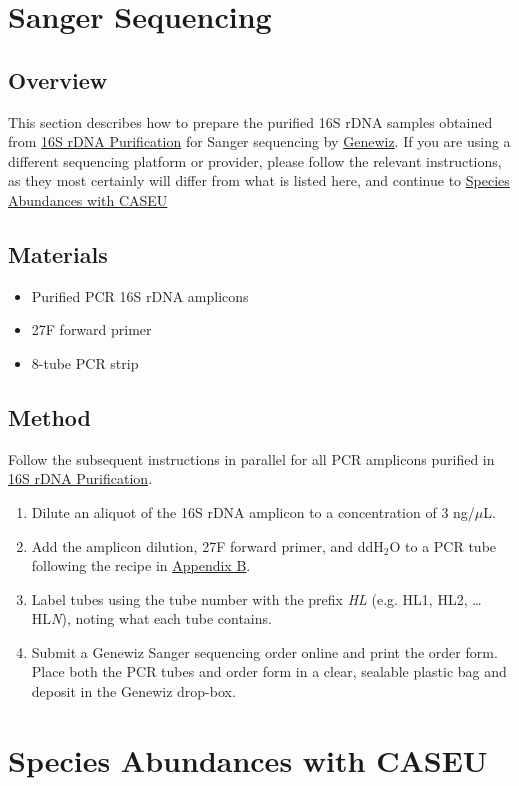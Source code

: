\documentclass[onecolumn]{article}
\begin{document}
\section{Sanger Sequencing}\label{SS}
\subsection{Overview}
This section describes how to prepare the purified 16S rDNA samples obtained from \hyperref[1rP]{16S rDNA Purification} for Sanger sequencing by \href{https://www.genewiz.com/}{Genewiz}.
If you are using a different sequencing platform or provider,
please follow the relevant instructions,
as they most certainly will differ from what is listed here,
and continue to \hyperref[SAwC]{Species Abundances with CASEU}

\subsection{Materials}
\begin{itemize}
  \item Purified PCR 16S rDNA amplicons
  \item 27F forward primer
  \item 8-tube PCR strip
\end{itemize}
\subsection{Method}
Follow the subsequent instructions in parallel for all PCR amplicons purified in \hyperref[1rA]{16S rDNA Purification}.
\begin{enumerate}
  \item Dilute an aliquot of the 16S rDNA amplicon to a concentration of 3 ng/$\mu$L.
  \item Add the amplicon dilution, 27F forward primer, and ddH$_2$O to a PCR tube following the recipe in \hyperref[aB]{Appendix B}.
  \item Label tubes using the tube number with the prefix \emph{HL} (e.g. HL1, HL2, \ldots HL\textit{N}), noting what each tube contains.
  \item Submit a Genewiz Sanger sequencing order online and print the order form. Place both the PCR tubes and order form in a clear, sealable plastic bag and deposit in the Genewiz drop-box.
\end{enumerate}

\section{Species Abundances with CASEU}\label{SAwC}
\end{document}
